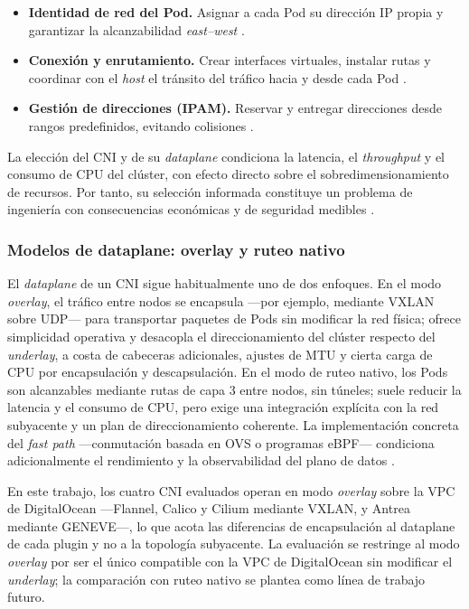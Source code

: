 \begin{itemize}
  \item \textbf{Identidad de red del Pod.} Asignar a cada Pod su dirección IP propia y garantizar la alcanzabilidad \emph{east--west} \cite{ref2}.
  \item \textbf{Conexión y enrutamiento.} Crear interfaces virtuales, instalar rutas y coordinar con el \emph{host} el tránsito del tráfico hacia y desde cada Pod \cite{ref18,ref4}.
  \item \textbf{Gestión de direcciones (IPAM).} Reservar y entregar direcciones desde rangos predefinidos, evitando colisiones \cite{ref20,ref18}.
\end{itemize}

La elección del CNI y de su \emph{dataplane} condiciona la latencia, el \emph{throughput} y el consumo de CPU del clúster, con efecto directo sobre el sobredimensionamiento de recursos. Por tanto, su selección informada constituye un problema de ingeniería con consecuencias económicas y de seguridad medibles \cite{ref7,ref8,ref11,ref22}.

\subsubsection{Modelos de dataplane: overlay y ruteo nativo}

El \emph{dataplane} de un CNI sigue habitualmente uno de dos enfoques. En el modo \emph{overlay}, el tráfico entre nodos se encapsula ---por ejemplo, mediante VXLAN sobre UDP--- para transportar paquetes de Pods sin modificar la red física; ofrece simplicidad operativa y desacopla el direccionamiento del clúster respecto del \emph{underlay}, a costa de cabeceras adicionales, ajustes de MTU y cierta carga de CPU por encapsulación y descapsulación. En el modo de ruteo nativo, los Pods son alcanzables mediante rutas de capa 3 entre nodos, sin túneles; suele reducir la latencia y el consumo de CPU, pero exige una integración explícita con la red subyacente y un plan de direccionamiento coherente. La implementación concreta del \emph{fast path} ---conmutación basada en OVS o programas eBPF--- condiciona adicionalmente el rendimiento y la observabilidad del plano de datos \cite{ref7,ref8,ref11,ref22}.

En este trabajo, los cuatro CNI evaluados operan en modo \emph{overlay} sobre la VPC de DigitalOcean ---Flannel, Calico y Cilium mediante VXLAN, y Antrea mediante GENEVE---, lo que acota las diferencias de encapsulación al dataplane de cada plugin y no a la topología subyacente. La evaluación se restringe al modo \emph{overlay} por ser el único compatible con la VPC de DigitalOcean sin modificar el \emph{underlay}; la comparación con ruteo nativo se plantea como línea de trabajo futuro.

